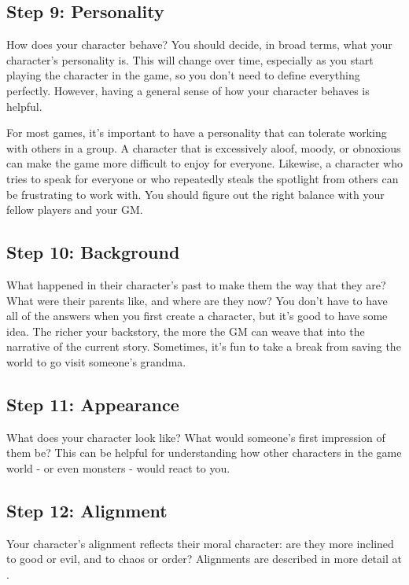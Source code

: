     \subsection{Step 9: Personality}

        How does your character behave?
        You should decide, in broad terms, what your character's personality is.
        This will change over time, especially as you start playing the character in the game, so you don't need to define everything perfectly.
        However, having a general sense of how your character behaves is helpful.

        For most games, it's important to have a personality that can tolerate working with others in a group.
        A character that is excessively aloof, moody, or obnoxious can make the game more difficult to enjoy for everyone.
        Likewise, a character who tries to speak for everyone or who repeatedly steals the spotlight from others can be frustrating to work with.
        You should figure out the right balance with your fellow players and your GM.\@

    \subsection{Step 10: Background}
        What happened in their character's past to make them the way that they are?
        What were their parents like, and where are they now?
        You don't have to have all of the answers when you first create a character, but it's good to have some idea.
        The richer your backstory, the more the GM can weave that into the narrative of the current story.
        Sometimes, it's fun to take a break from saving the world to go visit someone's grandma.

    \subsection{Step 11: Appearance}
        What does your character look like?
        What would someone's first impression of them be?
        This can be helpful for understanding how other characters in the game world - or even monsters - would react to you.

    \subsection{Step 12: Alignment}
        Your character's alignment reflects their moral character: are they more inclined to good or evil, and to chaos or order?
        Alignments are described in more detail at .

